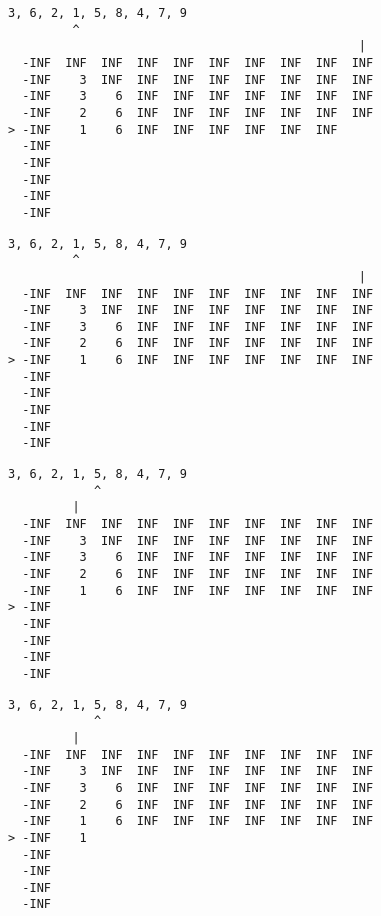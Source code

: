 { \begin{verbatim}
3, 6, 2, 1, 5, 8, 4, 7, 9
         ^
                                                 |
  -INF  INF  INF  INF  INF  INF  INF  INF  INF  INF
  -INF    3  INF  INF  INF  INF  INF  INF  INF  INF
  -INF    3    6  INF  INF  INF  INF  INF  INF  INF
  -INF    2    6  INF  INF  INF  INF  INF  INF  INF
> -INF    1    6  INF  INF  INF  INF  INF  INF     
  -INF                                             
  -INF                                             
  -INF                                             
  -INF                                             
  -INF                                             
\end{verbatim} }

{ \begin{verbatim}
3, 6, 2, 1, 5, 8, 4, 7, 9
         ^
                                                 |
  -INF  INF  INF  INF  INF  INF  INF  INF  INF  INF
  -INF    3  INF  INF  INF  INF  INF  INF  INF  INF
  -INF    3    6  INF  INF  INF  INF  INF  INF  INF
  -INF    2    6  INF  INF  INF  INF  INF  INF  INF
> -INF    1    6  INF  INF  INF  INF  INF  INF  INF
  -INF                                             
  -INF                                             
  -INF                                             
  -INF                                             
  -INF                                             
\end{verbatim} }

{ \begin{verbatim}
3, 6, 2, 1, 5, 8, 4, 7, 9
            ^
         |
  -INF  INF  INF  INF  INF  INF  INF  INF  INF  INF
  -INF    3  INF  INF  INF  INF  INF  INF  INF  INF
  -INF    3    6  INF  INF  INF  INF  INF  INF  INF
  -INF    2    6  INF  INF  INF  INF  INF  INF  INF
  -INF    1    6  INF  INF  INF  INF  INF  INF  INF
> -INF                                             
  -INF                                             
  -INF                                             
  -INF                                             
  -INF                                             
\end{verbatim} }

{ \begin{verbatim}
3, 6, 2, 1, 5, 8, 4, 7, 9
            ^
         |
  -INF  INF  INF  INF  INF  INF  INF  INF  INF  INF
  -INF    3  INF  INF  INF  INF  INF  INF  INF  INF
  -INF    3    6  INF  INF  INF  INF  INF  INF  INF
  -INF    2    6  INF  INF  INF  INF  INF  INF  INF
  -INF    1    6  INF  INF  INF  INF  INF  INF  INF
> -INF    1                                        
  -INF                                             
  -INF                                             
  -INF                                             
  -INF                                             
\end{verbatim} }

